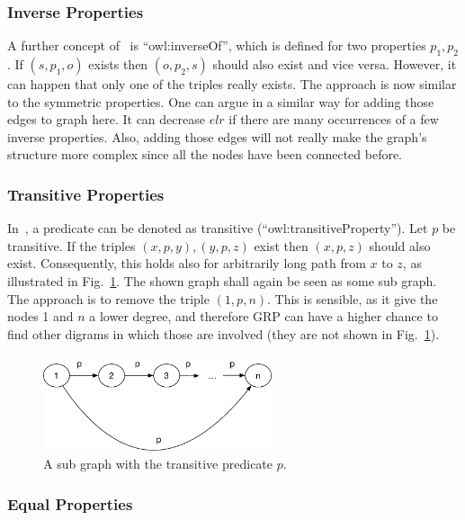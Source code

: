 \subsubsection{Inverse Properties}

A further concept of~\cite{owl} is  \enquote{owl:inverseOf}, which is defined for two properties $p_1, p_2$. If $(s,p_1,o)$ exists then $(o,p_2,s)$ should also exist and vice versa. However, it can happen that only one of the triples really exists. The approach is now similar to the symmetric properties. One can argue in a similar way for adding those edges to graph here. It can decrease $elr$ if there are many occurrences of a few inverse properties. Also, adding those edges will not really make the graph's structure more complex since all the nodes have been connected before.


\subsubsection{Transitive Properties}

In~\cite{owl}, a predicate can be denoted as transitive (\enquote{owl:transitiveProperty}). Let $p$ be transitive. If the triples $(x,p,y),(y,p,z)$ exist then $(x,p,z)$ should also exist. Consequently, this holds also for arbitrarily long path from $x$ to $z$, as illustrated in Fig.~\ref{fig:transitiveMat}. The shown graph shall again be seen as some sub graph. The approach is to remove the triple $(1,p,n)$. This is sensible, as it give the nodes 1 and $n$ a lower degree, and therefore GRP can have a higher chance to find other digrams in which those are involved (they are not shown in Fig.~\ref{fig:transitiveMat}).

\begin{figure}[h]
	\centering
	\includegraphics[width=0.6\textwidth]{figures/approach/transitiveMat}
	\caption{A sub graph with the transitive predicate $p$.}
	\label{fig:transitiveMat}
\end{figure}


\subsubsection{Equal Properties}

